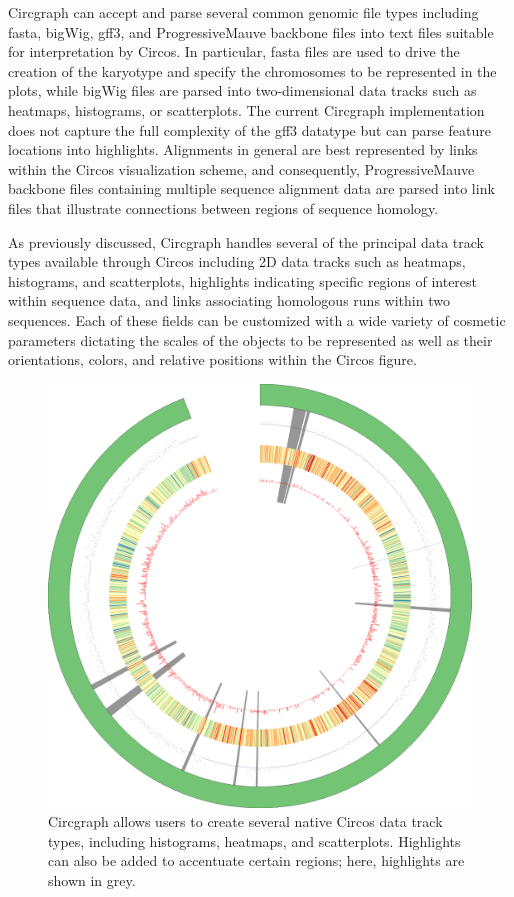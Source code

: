 \documentclass{article}
\begin{document}
Circgraph can accept and parse several common genomic file types including fasta, bigWig, gff3, and ProgressiveMauve backbone files into text files suitable for interpretation by Circos. In particular, fasta files are used to drive the creation of the karyotype and specify the chromosomes to be represented in the plots, while bigWig files are parsed into two-dimensional data tracks such as heatmaps, histograms, or scatterplots. The current Circgraph implementation does not capture the full complexity of the gff3 datatype but can parse feature locations into highlights. Alignments in general are best represented by links within the Circos visualization scheme, and consequently, ProgressiveMauve backbone files containing multiple sequence alignment data are parsed into link files that illustrate connections between regions of sequence homology.  

As previously discussed, Circgraph handles several of the principal data track types available through Circos including 2D data tracks such as heatmaps, histograms, and scatterplots, highlights indicating specific regions of interest within sequence data, and links associating homologous runs within two sequences. Each of these fields can be customized with a wide variety of cosmetic parameters dictating the scales of the objects to be represented as well as their orientations, colors, and relative positions within the Circos figure. 

\begin{figure}
\centering
\includegraphics[scale=0.1]{./results/hilite.png}
\caption{Circgraph allows users to create several native Circos data track types, including histograms, heatmaps, and scatterplots. Highlights can also be added to accentuate certain regions; here, highlights are shown in grey.}
\end{figure}
\end{document}
